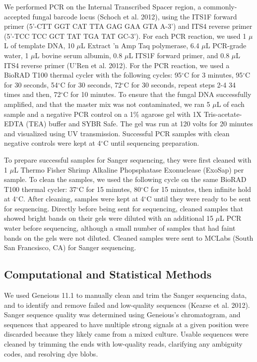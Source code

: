 \documentclass[fleqn,10pt,lineno]{wlpeerj} %
\begin{document}
We performed PCR on the Internal Transcribed Spacer region, a commonly-accepted fungal barcode locus (Schoch et al. 2012), using the ITS1F forward primer (5'-CTT GGT CAT TTA GAG GAA GTA A-3') and ITS4 reverse primer (5'-TCC TCC GCT TAT TGA TAT GC-3'). For each PCR reaction, we used 1 \(\mu\)L of template DNA, 10 \(\mu\)L Extract 'n Amp Taq polymerase, 6.4 \(\mu\)L PCR-grade water, 1 \(\mu\)L bovine serum albumin, 0.8 \(\mu\)L ITS1F forward primer, and 0.8 \(\mu\)L ITS4 reverse primer (U'Ren et al. 2012). For the PCR reaction, we used a BioRAD T100 thermal cycler with the following cycles: 95\(^{\circ}\)C for 3 minutes, 95\(^{\circ}\)C for 30 seconds, 54\(^{\circ}\)C for 30 seconds, 72\(^{\circ}\)C for 30 seconds, repeat steps 2-4 34 times and then, 72\(^{\circ}\)C for 10 minutes. To ensure that the fungal DNA successfully amplified, and that the master mix was not contaminated, we ran 5 \(\mu\)L of each sample and a negative PCR control on a 1\% agarose gel with 1X Tris-acetate-EDTA (TEA) buffer and SYBR Safe. The gel was run at 120 volts for 20 minutes and visualized using UV transmission. Successful PCR samples with clean negative controls were kept at 4\(^{\circ}\)C until sequencing preparation.

To prepare successful samples for Sanger sequencing, they were first cleaned with 1 \(\mu\)L Thermo Fisher Shrimp Alkaline Phopsphatase Exonuclease (ExoSap) per sample. To clean the samples, we used the following cycle on the same BioRAD T100 thermal cycler: 37\(^{\circ}\)C for 15 minutes, 80\(^{\circ}\)C for 15 minutes, then infinite hold at 4\(^{\circ}\)C. After cleaning, samples were kept at 4\(^{\circ}\)C until they were ready to be sent for sequencing. Directly before being sent for sequencing, cleaned samples that showed bright bands on their gels were diluted with an additional 15 \(\mu\)L PCR water before sequencing, although a small number of samples that had faint bands on the gels were not diluted. Cleaned samples were sent to MCLabs (South San Francsisco, CA) for Sanger sequencing.

\hypertarget{computational-and-statistical-methods}{%
\subsection*{Computational and Statistical Methods}\label{computational-and-statistical-methods}}

We used Geneious 11.1 to manually clean and trim the Sanger sequencing data, and to identify and remove failed and low-quality sequences (Kearse et al. 2012). Sanger sequence quality was determined using Geneious's chromatogram, and sequences that appeared to have multiple strong signals at a given position were discarded because they likely came from a mixed culture. Usable sequences were cleaned by trimming the ends with low-quality reads, clarifying any ambiguity codes, and resolving dye blobs.
\end{document}
